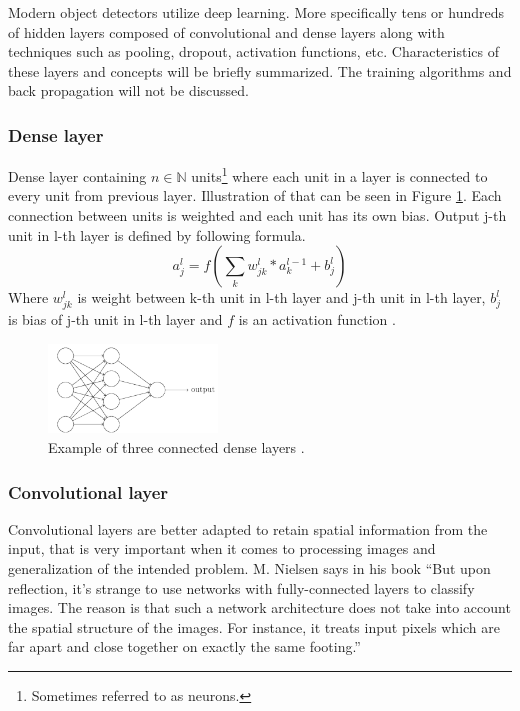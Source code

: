\documentclass[thesis=M,english]{FITthesis}[2019/03/06]
\begin{document}
Modern object detectors utilize deep learning. More specifically tens or hundreds of hidden layers composed of convolutional and dense layers along with techniques such as pooling, dropout, activation functions, etc. Characteristics of these layers and concepts will be briefly summarized. The training algorithms and back propagation will not be discussed.

\subsubsection{Dense layer}
Dense layer containing $n \in \mathbb{N}$ units\footnote{Sometimes referred to as neurons.} where each unit in a layer is connected to every unit from previous layer. Illustration of that can be seen in Figure \ref{label:dense_layers}. Each connection between units is weighted and each unit has its own bias. Output j-th unit in l-th layer is defined by following  formula.
$$ a_{j}^l = f(\sum_k w^l_{jk} * a^{l-1}_{k} + b^l_j) $$
Where \(w^l_{jk}\) is weight between k-th unit in l-th layer and j-th unit in l-th layer, \(b^l_j\) is bias of j-th unit in l-th layer and \(f\) is an activation function \cite{nielsenneural}.

\begin{figure}[!ht]
	\centering
	\includegraphics[width=0.4\textwidth]{imgs/dense-example.png}
	\caption{Example of three connected dense layers \cite{nielsenneural}.}
	\label{label:dense_layers}
\end{figure}

\subsubsection{Convolutional layer}
Convolutional layers are better adapted to retain spatial information from the input, that is very important when it comes to processing images and generalization of the intended problem. M. Nielsen says in his book \enquote{But
upon reflection, it’s strange to use networks with fully-connected layers to classify images.
The reason is that such a network architecture does not take into account the spatial structure
of the images. For instance, it treats input pixels which are far apart and close together
on exactly the same footing.} \cite{nielsenneural} \\
\end{document}
